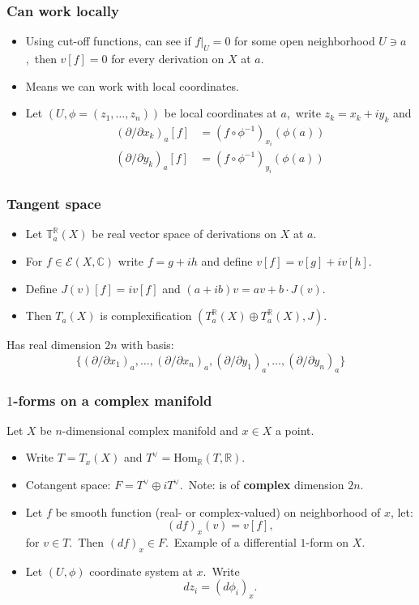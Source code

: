 \documentclass[usenames,dvipsnames]{beamer}
\theoremstyle{definition}
\begin{document}
\begin{frame}
  \frametitle{Can work locally}
  \begin{itemize}
    \item Using cut-off functions, can see if $f|_U=0$ for some open neighborhood $U\ni a$,\pause~then $v[f]=0$ for every derivation on $X$ at $a$.\pause
    \item Means we can work with local coordinates.\pause
    \item Let $(U,\phi=(z_1,\dots,z_n))$ be local coordinates at $a$,\pause~write $z_k=x_k+iy_k$ and\pause
      \begin{align*}
        (\partial/\partial x_k)_a[f]&=(f\circ\phi^{-1})_{x_i}(\phi(a))\\
        (\partial/\partial y_k)_a[f]&=(f\circ\phi^{-1})_{y_i}(\phi(a))
      \end{align*}
  \end{itemize}
\end{frame}

\begin{frame}
  \frametitle{Tangent space}
  \begin{itemize}
    \item Let $\mathbb{T}_a^\mathbb{R}(X)$ be real vector space of derivations on $X$ at $a$.\pause
    \item For $f\in\mathcal{E}(X,\mathbb{C})$ write $f=g+ih$ and define $v[f]=v[g]+iv[h]$.\pause
    \item Define $J(v)[f]=iv[f]$ and $(a+ib)v=av+b\cdot J(v)$.\pause
    \item Then $T_a(X)$ is complexification $(T_a^\mathbb{R}(X)\oplus T_a^\mathbb{R}(X),J)$.\pause
  \end{itemize}
  Has real dimension $2n$ with basis:\pause
  \[\{(\partial/\partial x_1)_a,\dots,(\partial/\partial x_n)_a,(\partial/\partial y_1)_a,\dots,(\partial/\partial y_n)_a\}\]
\end{frame}

\begin{frame}
  \frametitle{$1$-forms on a complex manifold}
  Let $X$ be $n$-dimensional complex manifold and $x\in X$ a point.
  \begin{itemize}
    \item Write $T=T_x(X)$ and $T^\vee=\mathrm{Hom}_\mathbb{R}(T,\mathbb{R})$.\pause
    \item Cotangent space: $F=T^\vee\oplus iT^\vee$.\pause~Note: is of {\bf complex} dimension $2n$.\pause
    \item Let $f$ be smooth function (real- or complex-valued) on neighborhood of $x$, let:\pause
      \[(df)_x(v)=v[f],\]\pause
      for $v\in T$.\pause~Then $(df)_x\in F$.\pause~Example of a differential $1$-form on $X$.\pause
    \item Let $(U,\phi)$ coordinate system at $x$.\pause~Write\pause
      \[dz_i=(d\phi_i)_x.\]
  \end{itemize}
\end{frame}
\end{document}
